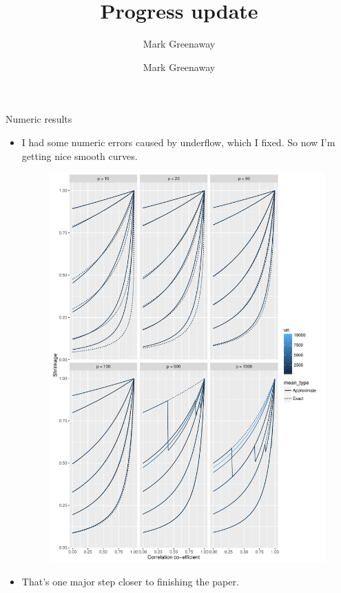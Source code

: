 \documentclass{beamer}
\title{Progress update}
\author{Mark Greenaway}
\author{Mark Greenaway}
\begin{document}
\begin{frame}
	\maketitle
\end{frame}
\begin{frame}{Numeric results}
	\begin{itemize}
		\item I had some numeric errors caused by underflow, which I fixed. So now I'm getting nice smooth curves.
		      \begin{figure}
		      	\includegraphics[scale=.25]{Chapter_3_shrinkage.pdf}
		      \end{figure}
		\item That's one major step closer to finishing the paper.
	\end{itemize}%
\end{frame}
\end{document}
